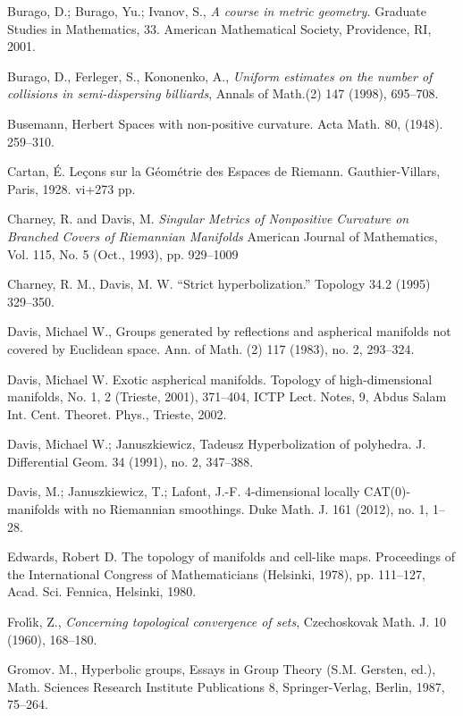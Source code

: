 \begin{thebibliography}{52}
 Burago, D.; Burago, Yu.; Ivanov, S., \textit{A course in metric geometry.} Graduate Studies in Mathematics, 33. American Mathematical Society, Providence, RI, 2001. 

Burago, D., Ferleger, S., Kononenko, A.,
\textit{Uniform estimates on the number of collisions in semi-dispersing billiards},
Annals of Math.(2) 147 (1998), 695--708.

Busemann, Herbert 
Spaces with non-positive curvature. Acta Math. 80, (1948). 259--310.

Cartan, \'E.
Le\c{c}ons sur la G\'eom\'etrie des Espaces de Riemann. 
Gauthier-Villars, Paris, 1928. vi+273 pp.

Charney, R. and  Davis, M.
\textit{Singular Metrics of Nonpositive Curvature on Branched Covers of Riemannian Manifolds}
American Journal of Mathematics, Vol. 115, No. 5 (Oct., 1993), pp. 929--1009

Charney, R. M., Davis, M. W. 
``Strict hyperbolization.'' Topology 34.2 (1995) 329--350.

Davis, Michael W., Groups generated by reflections and aspherical manifolds not covered by Euclidean space.
Ann. of Math. (2) 117 (1983), no. 2, 293--324. 

 Davis, Michael W. Exotic aspherical manifolds. Topology of high-dimensional manifolds, No. 1, 2 (Trieste, 2001), 371--404, ICTP Lect. Notes, 9, Abdus Salam Int. Cent. Theoret. Phys., Trieste, 2002.



 Davis, Michael W.; Januszkiewicz, Tadeusz Hyperbolization of polyhedra. J. Differential Geom. 34 (1991), no. 2, 347--388.

Davis, M.; 
Januszkiewicz, T.; 
Lafont, J.-F.
4-dimensional locally CAT(0)-manifolds with no Riemannian smoothings. 
Duke Math. J. 161 (2012), no. 1, 1--28.

 Edwards, Robert D. The topology of manifolds and cell-like maps. Proceedings of the International Congress of Mathematicians (Helsinki, 1978), pp. 111--127, Acad. Sci. Fennica, Helsinki, 1980.

 Frol\'{\i}k, Z., \textit{Concerning topological convergence of sets}, Czechoskovak Math. J. 10 (1960), 168--180.

Gromov. M.,
Hyperbolic groups, 
Essays in Group Theory (S.M. Gersten, ed.),
Math. Sciences Research Institute Publications 8,
Springer-Verlag, Berlin,
1987, 75--264.


\end{thebibliography}
